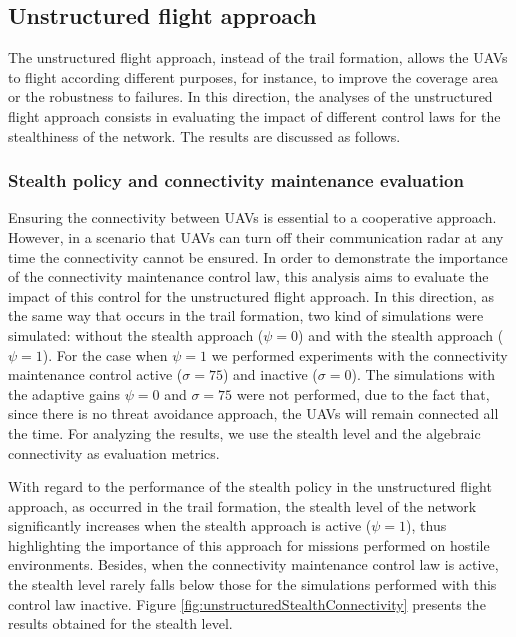\subsection{Unstructured flight approach}

The unstructured flight approach, instead of the trail formation, allows the UAVs to flight according different purposes, for instance, to improve the coverage area or the robustness to failures. In this direction, the analyses of the unstructured flight approach consists in evaluating the impact of different control laws for the stealthiness of the network. The results are discussed as follows.

\subsubsection{Stealth policy and connectivity maintenance evaluation}

Ensuring the connectivity between UAVs is essential to a cooperative approach. However, in a scenario that UAVs can turn off their communication radar at any time the connectivity cannot be ensured. In order to demonstrate the importance of the connectivity maintenance control law, this analysis aims to evaluate the impact of this control for the unstructured flight approach. In this direction, as the same way that occurs in the trail formation, two kind of simulations were simulated: without the stealth approach ($\psi=0$) and with the stealth approach ($\psi=1$). For the case when $\psi=1$ we performed experiments with the connectivity maintenance control active ($\sigma=75$) and  inactive ($\sigma=0$). The simulations with the adaptive gains $\psi=0$ and $\sigma=75$ were not performed, due to the fact that, since there is no threat avoidance approach, the UAVs will remain connected all the time. For analyzing the results, we use the stealth level and the algebraic connectivity as evaluation metrics.

With regard to the performance of the stealth policy in the unstructured flight approach, as occurred in the trail formation, the stealth level of the network significantly increases when the stealth approach is active ($\psi=1$), thus highlighting the importance of this approach for missions performed on hostile environments. Besides,  when the connectivity maintenance control law is active, the stealth level rarely falls below those for the simulations performed with this control law inactive. Figure \ref{fig:unstructuredStealthConnectivity} presents the results obtained for the stealth level.

